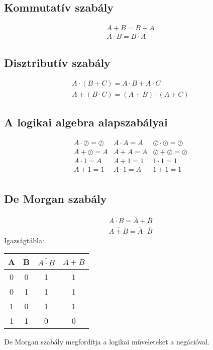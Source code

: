 \documentclass{article}
\begin{document}
\subsection{Kommutatív szabály}
\begin{align*}
    A + B = B + A \\
    A \cdot B = B \cdot A
\end{align*}

\subsection{Disztributív szabály}
\begin{align*}
    A \cdot (B + C) = A \cdot B + A \cdot C \\
    A + (B \cdot C) = (A + B) \cdot (A + C)
\end{align*}

\subsection{A logikai algebra alapszabályai}
\[\begin{array}{lll}
        A \cdot \oslash = \oslash & A \cdot A = A & \oslash \cdot \oslash = \oslash \\
        A + \oslash = A & A + A = A & \oslash + \oslash = \oslash \\
        A \cdot 1 = A & A + 1 = 1 & 1 \cdot 1 = 1 \\
        A + 1 = 1 & A \cdot 1 = A & 1 + 1 = 1 \\
\end{array}\]

\subsection{De Morgan szabály}
\begin{align*}
    \overline{A \cdot B} = \overline{A} + \overline{B} \\
    \overline{A + B} = \overline{A} \cdot \overline{B}
\end{align*}
Igazságtábla:
\begin{table}[ht]
    \begin{tabular}{|c|c|c|c|}
        \hline
        \textbf{A} & \textbf{B} & \textbf{\(\overline{A \cdot B}\)} & \textbf{\(\overline{A} + \overline{B}\)} \\
        \hline
        0          & 0          & 1                             & 1                             \\
        \hline
        0          & 1          & 1                             & 1                             \\
        \hline
        1          & 0          & 1                             & 1                             \\
        \hline
        1          & 1          & 0                             & 0                             \\
        \hline
    \end{tabular}
\end{table}
\newline
De Morgan szabály megfordítja a logikai műveleteket a negációval.
\end{document}
